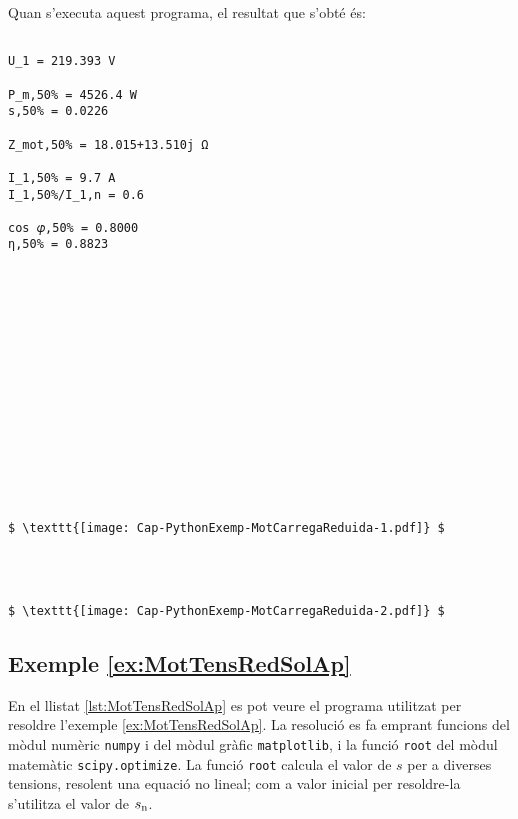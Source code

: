 Quan s'executa aquest programa, el resultat que s'obté és:
\lstset{
	language=,
	numbers=none,
	frame=none
}
\begin{lstlisting}[mathescape=true]
	
U_1 = 219.393 V

P_m,50% = 4526.4 W
s,50% = 0.0226

Z_mot,50% = 18.015+13.510j Ω

I_1,50% = 9.7 A
I_1,50%/I_1,n = 0.6

cos 𝜑,50% = 0.8000
η,50% = 0.8823
















$ \texttt{[image: Cap-PythonExemp-MotCarregaReduida-1.pdf]} $




$ \texttt{[image: Cap-PythonExemp-MotCarregaReduida-2.pdf]} $
\end{lstlisting} 


\hypertarget{exemple:MotTensRedSolAp}{\subsection{Exemple \ref*{ex:MotTensRedSolAp} \MotTensRedSolAp}}
En el llistat \vref{lst:MotTensRedSolAp} es pot veure el programa utilitzat per resoldre l'exemple \vref{ex:MotTensRedSolAp}. La resolució es fa emprant funcions del mòdul numèric \texttt{numpy} i del mòdul gràfic \texttt{matplotlib}, i la funció \texttt{root} del mòdul matemàtic \texttt{scipy.optimize}. La funció \texttt{root} calcula el valor de $s$ per a diverses tensions, resolent una equació no lineal; com a valor inicial per resoldre-la  s'utilitza el valor de $s_\mathrm{n}$.


